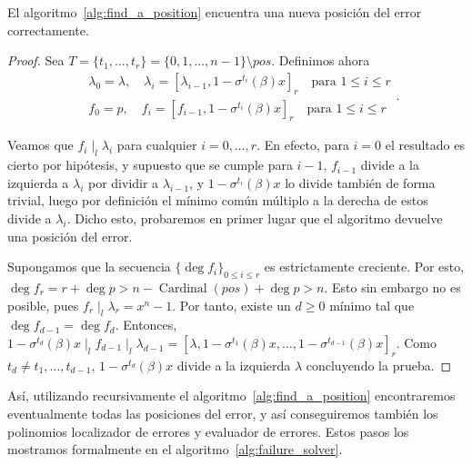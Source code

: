 \begin{proposition}
    El algoritmo~\ref{alg:find_a_position} encuentra una nueva posición del error correctamente.
\end{proposition}
\begin{proof}
    Sea \(T = \{t_1, \ldots, t_r\} = \{0, 1, ..., n-1\} \setminus pos\). Definimos ahora
\[
\begin{aligned}
&\lambda_0 = \lambda, \quad \lambda_i = {[\lambda _{i-1}, 1 - \sigma^{t_i}(\beta)x]}_r\quad \text{para } 1 \le i \le r \\
&f_0 = p, \quad f_i = {[f _{i-1}, 1 - \sigma^{t_i}(\beta)x]}_r\quad \text{para } 1 \le i \le r
\end{aligned}
.\]

Veamos que \(f_i  \mid_l \lambda_i\) para cualquier \(i = 0, \ldots, r\). En efecto, para \(i = 0\) el resultado es cierto por hipótesis, y supuesto que se cumple para \(i-1\), \(f_{i-1}\) divide a la izquierda a \(\lambda_i\) por dividir a \(\lambda_{i-1}\), y \(1- \sigma^{t_i}(\beta)x\) lo divide también de forma trivial, luego por definición el mínimo común múltiplo a la derecha de estos divide a \(\lambda_i\). Dicho esto, probaremos en primer lugar que el algoritmo devuelve una posición del error.

Supongamos que la secuencia \(\{\deg f_i\}_{0 \le i \le r}\) es estrictamente creciente. Por esto, \( \deg f_r = r + \deg p > n - \operatorname{Cardinal}(pos) + \deg p > n \). Esto sin embargo no es posible, pues \(f_r  \mid_l \lambda_r = x^{n} - 1\). Por tanto, existe un \(d \ge 0\) mínimo tal que \(\deg f_{d-1} = \deg f_{d}\). Entonces, \(1 - \sigma^{t_d}(\beta)x   \mid_l f_{d-1}  \mid_l \lambda_{d-1} = {[\lambda, 1 - \sigma^{t_1}(\beta)x, \ldots, 1 - \sigma^{t_{d-1}}(\beta)x]}_r \). Como \(t_{d} \neq t_1, \ldots, t_{d-1}\),  \(1 - \sigma^{t_d}(\beta)x \) divide a la izquierda \(\lambda\) concluyendo la prueba.
\end{proof}

Así, utilizando recursivamente el algoritmo~\ref{alg:find_a_position} encontraremos eventualmente todas las posiciones del error, y así conseguiremos también los polinomios localizador de errores y evaluador de errores. Estos pasos los mostramos formalmente en el algoritmo~\ref{alg:failure_solver}.

